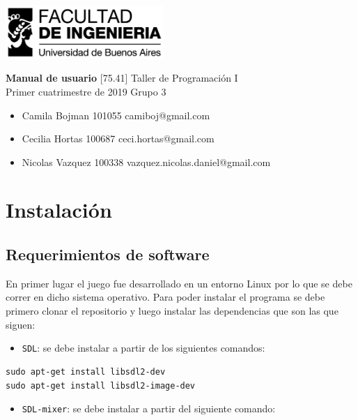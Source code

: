 \documentclass[a4paper]{article}
\newcommand{\materia}{[75.41] Taller de Programación I}
\newcommand{\trabajo}{Manual de usuario}
\newcommand{\cuatrimestre}{Primer cuatrimestre de 2019}
\newcommand{\grupo}{Grupo 3}
\begin{document}
	\setcounter{page}{1}
	
	\begin{titlepage}
		\hfill\includegraphics[width=6cm]{fiuba.jpeg}
		\begin{center}
			\vfill
			\Huge \textbf{\trabajo}
			\vskip2cm
			\Large \materia\\
			\cuatrimestre
			\vfill
			\grupo
			\begin{itemize}
				\item Camila Bojman 101055 camiboj@gmail.com
				\item Cecilia Hortas 100687 ceci.hortas@gmail.com
				\item Nicolas Vazquez 100338 vazquez.nicolas.daniel@gmail.com
			\end{itemize}
			\vskip1cm
		\end{center}
	\end{titlepage}

\section{Instalación}

\subsection{Requerimientos de software}

En primer lugar el juego fue desarrollado en un entorno Linux por lo que se debe correr en dicho sistema operativo. Para poder instalar el programa se debe primero clonar el repositorio y luego instalar las dependencias que son las que siguen:

\begin{itemize}
	\item \texttt{SDL}: se debe instalar a partir de los siguientes comandos:
\end{itemize}

\begin{verbatim}
sudo apt-get install libsdl2-dev
sudo apt-get install libsdl2-image-dev
\end{verbatim}

\begin{itemize}
	\item \texttt{SDL-mixer}: se debe instalar a partir del siguiente comando:
\end{itemize}
\end{document}
